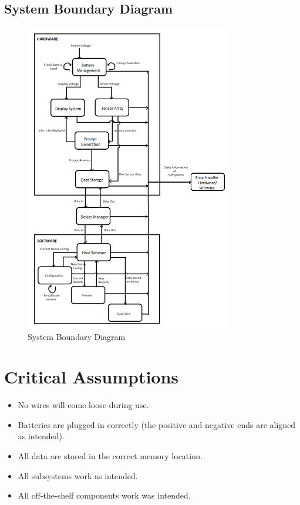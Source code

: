\documentclass{article}
\begin{document}
\subsection{System Boundary Diagram}
\begin{figure}[H]
	\begin{center}
		\includegraphics[width=0.80\textwidth]{SystemBoundaryDiagram}
		\caption{System Boundary Diagram}
		\label{Fig_SBD}
	\end{center}
\end{figure}


\section{Critical Assumptions }

\begin{itemize}
	\item No wires will come loose during use.
	\item Batteries are plugged in correctly (the positive and negative ends are aligned as intended).
	\item All data are stored in the correct memory location.
	\item All subsystems work as intended.
	\item All off-the-shelf components work was intended.
\end{itemize}
\end{document}
